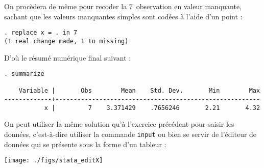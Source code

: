 On procèdera de même pour recoder la 7\ieme\ observation en valeur
manquante, sachant que les valeurs manquantes simples sont codées à l'aide
d'un point :
\begin{verbatim}
. replace x = . in 7   
(1 real change made, 1 to missing)
\end{verbatim}
D'où le résumé numérique final suivant :
\begin{verbatim}
. summarize

    Variable |       Obs        Mean    Std. Dev.       Min        Max
-------------+--------------------------------------------------------
           x |         7    3.371429    .7656246       2.21       4.32
\end{verbatim}
% 
%
%
\soln{\ref{exo:8.2}} On peut utiliser la même solution qu'à l'exercice
précédent pour saisir les données, c'est-à-dire utiliser la commande
\texttt{input} ou bien se servir de l'éditeur de données qui se présente sous
la forme d'un tableur :

\texttt{[image: ./figs/stata\_editX]}


